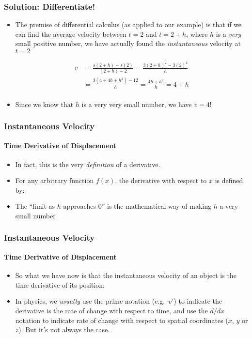 \documentclass[12pt,compress,aspectratio=169]{beamer}
\begin{document}
\begin{frame}
  \frametitle{Solution: Differentiate!}
  \begin{itemize}
  \item The premise of differential calculus (as applied to our example) is
    that if we can find the average velocity between $t=2$ and
    $t=2+h$, where $h$ is a \emph{very} small positive number, we have
    actually found the \emph{instantaneous} velocity at $t=2$

    \begin{align*}
      v&=\frac{s(2+h)-s(2)}{(2+h)-2}=\frac{3(2+h)^2-3(2)^2}{h}\\
      &=\frac{3(4+4h+h^2)-12}{h}=\frac{4h+h^2}{h}=4+h\\
    \end{align*}
  \item Since we know that $h$ is a very very small number, we have $v=4$!
  \end{itemize}
\end{frame}


\begin{frame}
  \frametitle{Instantaneous Velocity}
  \framesubtitle{Time Derivative of Displacement}
  \begin{itemize}
  \item In fact, this is the very \emph{definition} of a derivative.
  \item For any arbitrary function $f(x)$, the derivative with respect to $x$
    is defined by:

  \item The ``limit as $h$ approaches $0$'' is the mathematical way of making
    $h$ a very small number
  \end{itemize}
\end{frame}

\begin{frame}
  \frametitle{Instantaneous Velocity}
  \framesubtitle{Time Derivative of Displacement}
  \begin{itemize}
  \item So what we have now is that the instantaneous velocity of an object is
    the time derivative of its position:
    
  
  \item In physics, we \emph{usually} use the prime notation (e.g.\ $v'$) to
    indicate the derivative is the rate of change with respect to time, and use
    the $d/dx$ notation to indicate rate of change with respect to spatial
    coordinates ($x$, $y$ or $z$). But it's not always the case.
  \end{itemize}
\end{frame}
\end{document}
